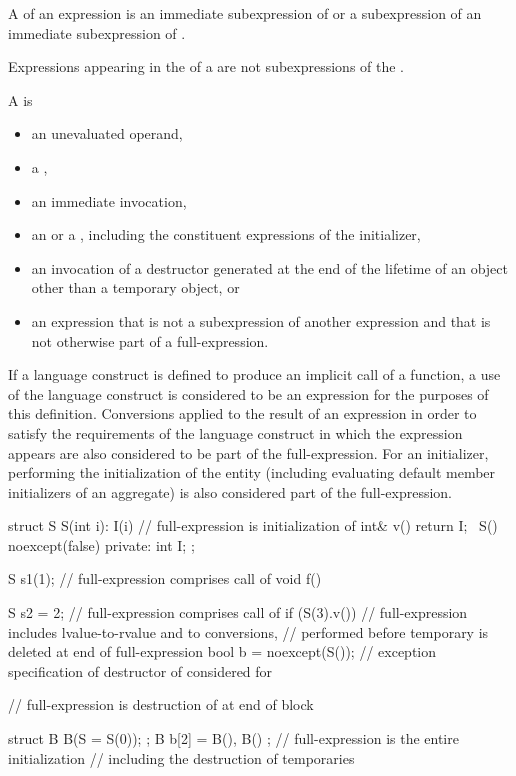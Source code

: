 \pnum
A  of an expression  is
an immediate subexpression of  or
a subexpression of an immediate subexpression of .
\begin{note}
Expressions appearing in the  of a 
are not subexpressions of the .
\end{note}

\pnum
A  is
\begin{itemize}
\item
an unevaluated operand,
\item
a ,
\item
an immediate invocation,
\item
an  or
a ,
including the constituent expressions of the initializer,
\item
an invocation of a destructor generated at the end of the lifetime
of an object other than a temporary object, or
\item
an expression that is not a subexpression of another expression and
that is not otherwise part of a full-expression.
\end{itemize}
If a language construct is defined to produce an implicit call of a function,
a use of the language construct is considered to be an expression
for the purposes of this definition.
Conversions applied to the result of an expression in order to satisfy the requirements
of the language construct in which the expression appears
are also considered to be part of the full-expression.
For an initializer, performing the initialization of the entity
(including evaluating default member initializers of an aggregate)
is also considered part of the full-expression.
\begin{example}
\begin{codeblock}
struct S {
  S(int i): I(i) { }            // full-expression is initialization of 
  int& v() { return I; }
  ~S() noexcept(false) { }
private:
  int I;
};

S s1(1);                        // full-expression comprises call of 
void f() {
  S s2 = 2;                     // full-expression comprises call of 
  if (S(3).v())                 // full-expression includes lvalue-to-rvalue and  to  conversions,
                                // performed before temporary is deleted at end of full-expression
  { }
  bool b = noexcept(S());       // exception specification of destructor of  considered for 

  // full-expression is destruction of  at end of block
}
struct B {
  B(S = S(0));
};
B b[2] = { B(), B() };          // full-expression is the entire initialization
                                // including the destruction of temporaries
\end{codeblock}
\end{example}

